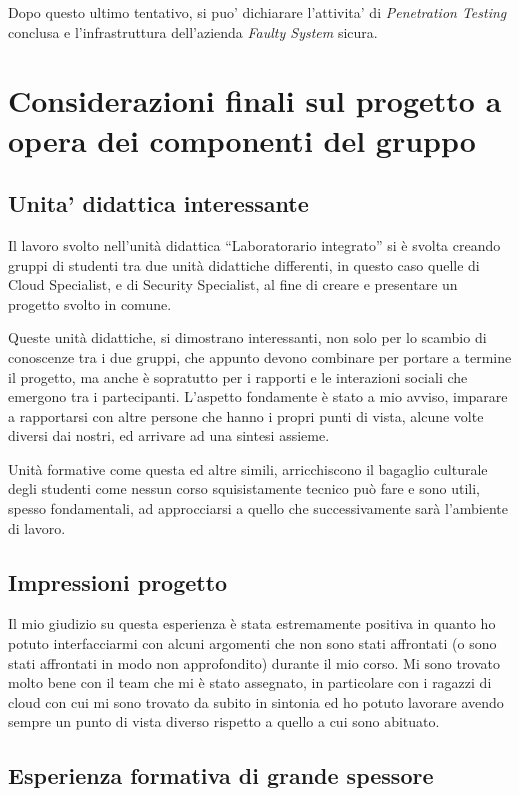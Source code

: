 \documentclass[a4paper]{report}
\newcommand{\quotes}[1]{``#1''}
\begin{document}
		Dopo questo ultimo tentativo, si puo' dichiarare l'attivita' di \emph{Penetration Testing} conclusa e
		l'infrastruttura dell'azienda \emph{Faulty System} sicura.

\chapter{Considerazioni finali sul progetto a opera dei componenti del gruppo}
	\section{Unita' didattica interessante}
	\author{Riccardo De Lazzari}

	Il lavoro svolto nell'unità didattica \quotes{Laboratorario integrato} si è svolta creando gruppi di studenti tra
	due unità didattiche differenti, in questo caso quelle di Cloud Specialist, e di Security Specialist, al fine di
	creare e presentare un progetto svolto in comune.
	
	Queste unità didattiche, si dimostrano interessanti, non solo per lo scambio di conoscenze tra i due gruppi, che
	appunto devono combinare per portare a termine il progetto, ma anche è sopratutto per i rapporti e le interazioni
	sociali che emergono tra i partecipanti. L'aspetto fondamente è stato a mio avviso, imparare a rapportarsi con altre
	persone che hanno i propri punti di vista, alcune volte diversi dai nostri, ed arrivare ad una sintesi assieme.
	
	Unità formative come questa ed altre simili, arricchiscono il bagaglio culturale degli studenti come nessun corso
	squisistamente tecnico può fare e sono utili, spesso fondamentali, ad approcciarsi a quello che successivamente sarà
	l'ambiente di lavoro.

	\section{Impressioni progetto}
	\author{Lorenzo Dellera}

	Il mio giudizio su questa esperienza è stata estremamente positiva in quanto ho potuto interfacciarmi con alcuni argomenti che non sono stati affrontati (o sono stati affrontati in modo non approfondito) durante il mio corso. Mi sono trovato molto bene con il team che mi è stato assegnato, in particolare con i ragazzi di cloud con cui mi sono trovato da subito in sintonia ed ho potuto lavorare avendo sempre un punto di vista diverso rispetto a quello a cui sono abituato.
	\section{Esperienza formativa di grande spessore}
	\author{Riccardo Oglietti}
\end{document}
